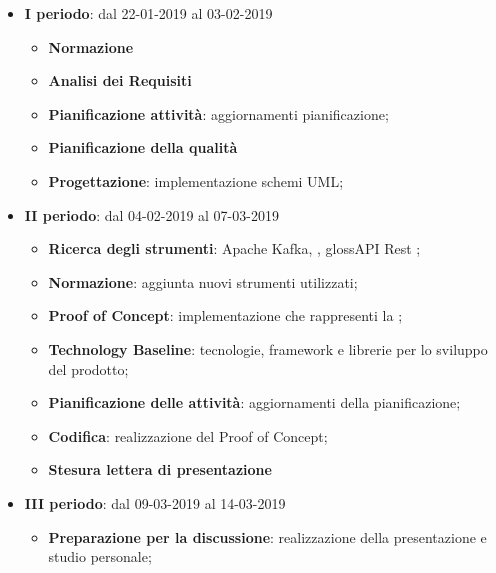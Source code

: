 		\begin{itemize}
			\item \textbf{I periodo}: dal 22-01-2019 al 03-02-2019
			\begin{itemize}
    	        \item \textbf{Normazione}
    	        \item \textbf{Analisi dei Requisiti}
    	        \item \textbf{Pianificazione attività}: aggiornamenti pianificazione;
    	        \item \textbf{Pianificazione della qualità}
    	        \item \textbf{Progettazione}: implementazione schemi UML;
        	\end{itemize}
			\item \textbf{II periodo}: dal 04-02-2019 al 07-03-2019
			\begin{itemize}
				\item \textbf{Ricerca degli strumenti}: Apache Kafka, , gloss{API Rest} ;
    	        \item \textbf{Normazione}: aggiunta nuovi strumenti utilizzati;
    	        \item \textbf{Proof of Concept}: implementazione che rappresenti la ;
    	        \item \textbf{Technology Baseline}: tecnologie, framework e librerie per lo sviluppo del prodotto;
    	        \item \textbf{Pianificazione delle attività}: aggiornamenti della pianificazione;
    	        \item \textbf{Codifica}: realizzazione del Proof of Concept;
    	        \item \textbf{Stesura lettera di presentazione}
        	\end{itemize}
        	\item \textbf{III periodo}: dal 09-03-2019 al 14-03-2019
			\begin{itemize}
				\item \textbf{Preparazione per la discussione}: realizzazione della presentazione e studio personale;
        	\end{itemize}
		\end{itemize}
        
